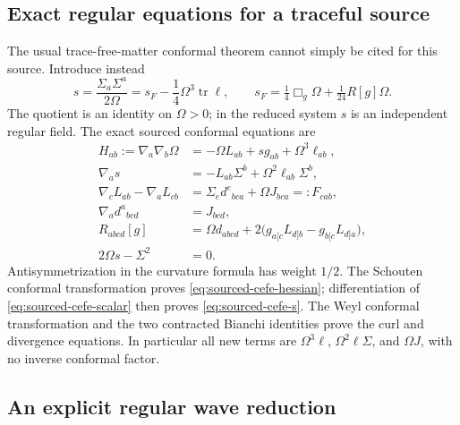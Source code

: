 \subsection{Exact regular equations for a traceful source}

The usual trace-free-matter conformal theorem cannot simply be cited for this
source.  Introduce instead
\[
 s=\frac{\Sigma_a\Sigma^a}{2\Omega}
   =s_F-\frac14\Omega^3\operatorname{tr}\ell,
 \qquad s_F=\tfrac14\Box_g\Omega+\tfrac1{24}R[g]\Omega.
\]
The quotient is an identity on $\Omega>0$; in the reduced system $s$ is an
independent regular field.  The exact sourced conformal equations are
\begin{align}
 H_{ab}:=\nabla_a\nabla_b\Omega
  &=-\Omega L_{ab}+sg_{ab}+\Omega^3\ell_{ab},
       \label{eq:sourced-cefe-hessian}\\
 \nabla_as&=-L_{ab}\Sigma^b+\Omega^2\ell_{ab}\Sigma^b,
       \label{eq:sourced-cefe-s}\\
 \nabla_cL_{ab}-\nabla_aL_{cb}
  &=\Sigma_ed^e{}_{bca}+\Omega J_{bca}=:F_{cab},
       \label{eq:sourced-cefe-curl}\\
 \nabla_ad^a{}_{bcd}&=J_{bcd},
       \label{eq:sourced-cefe-bianchi}\\
 R_{abcd}[g]&=\Omega d_{abcd}
    +2\bigl(g_{a[c}L_{d]b}-g_{b[c}L_{d]a}\bigr),
       \label{eq:sourced-cefe-curvature}\\
 2\Omega s-\Sigma^2&=0.
       \label{eq:sourced-cefe-scalar}
\end{align}
Antisymmetrization in the curvature formula has weight $1/2$.
The Schouten conformal transformation proves
\eqref{eq:sourced-cefe-hessian}; differentiation of
\eqref{eq:sourced-cefe-scalar} then proves
\eqref{eq:sourced-cefe-s}.  The Weyl conformal transformation and the two
contracted Bianchi identities prove the curl and divergence equations.
In particular all new terms are $\Omega^3\ell$, $\Omega^2\ell\Sigma$,
and $\Omega J$, with no inverse conformal factor.

\subsection{An explicit regular wave reduction}

